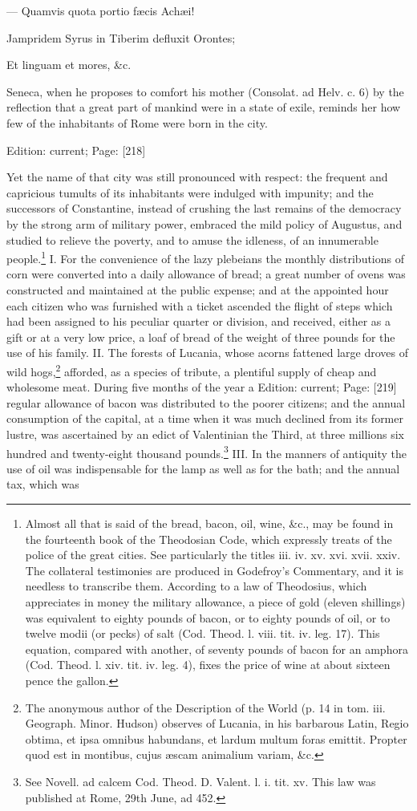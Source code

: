 {{—} Quamvis quota portio fæcis Achæi!

Jampridem Syrus in Tiberim defluxit Orontes;

Et linguam et mores, \&c.

Seneca, when he proposes to comfort his mother (Consolat. ad Helv. c. 6) by the reflection that a great part of mankind were in a state of exile, reminds her how few of the inhabitants of Rome were born in the city.}
Edition: current; Page: [218]

Yet the name of that city was still pronounced with respect: the frequent and capricious tumults of its inhabitants were indulged with impunity; and the successors of Constantine, instead of crushing the last remains of the democracy by the strong arm of military power, embraced the mild policy of Augustus, and studied to relieve the poverty, and to amuse the idleness, of an innumerable people.\footnote{Almost all that is said of the bread, bacon, oil, wine, \&c., may be found in the fourteenth book of the Theodosian Code, which expressly treats of the police of the great cities. See particularly the titles iii. iv. xv. xvi. xvii. xxiv. The collateral testimonies are produced in Godefroy\texthebrew{}’s Commentary, and it is needless to transcribe them. According to a law of Theodosius, which appreciates in money the military allowance, a piece of gold (eleven shillings) was equivalent to eighty pounds of bacon, or to eighty pounds of oil, or to twelve modii (or pecks) of salt (Cod. Theod. l. viii. tit. iv. leg. 17). This equation, compared with another, of seventy pounds of bacon for an amphora (Cod. Theod. l. xiv. tit. iv. leg. 4), fixes the price of wine at about sixteen pence the gallon.} I. For the convenience of the lazy plebeians the monthly distributions of corn were converted into a daily allowance of bread; a great number of ovens was constructed and maintained at the public expense; and at the appointed hour each citizen who was furnished with a ticket ascended the flight of steps which had been assigned to his peculiar quarter or division, and received, either as a gift or at a very low price, a loaf of bread of the weight of three pounds for the use of his family. II. The forests of Lucania, whose acorns fattened large droves of wild hogs,\footnote{The anonymous author of the Description of the World (p. 14 in tom. iii. Geograph. Minor. Hudson) observes of Lucania, in his barbarous Latin, Regio obtima, et ipsa omnibus habundans, et lardum multum foras emittit. Propter quod est in montibus, cujus æscam animalium variam, \&c.} afforded, as a species of tribute, a plentiful supply of cheap and wholesome meat. During five months of the year a Edition: current; Page: [219] regular allowance of bacon was distributed to the poorer citizens; and the annual consumption of the capital, at a time when it was much declined from its former lustre, was ascertained by an edict of Valentinian the Third, at three millions six hundred and twenty-eight thousand pounds.\footnote{See Novell. ad calcem Cod. Theod. D. Valent. l. i. tit. xv. This law was published at Rome, 29th June, ad 452.} III. In the manners of antiquity the use of oil was indispensable for the lamp as well as for the bath; and the annual tax, which was 
